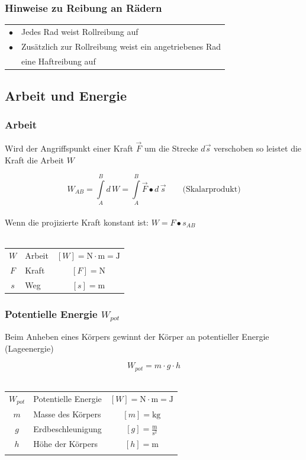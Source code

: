 		\subsubsection{Hinweise zu Reibung an Rädern}
		
			\begin{tabular}{ll}
				$\bullet$ & Jedes Rad weist Rollreibung auf \\
				$\bullet$ & Zusätzlich zur Rollreibung weist ein angetriebenes Rad \\
				          & eine Haftreibung auf \\
			\end{tabular}

	\subsection{Arbeit und Energie}
	
		\subsubsection{Arbeit}
		
			Wird der Angriffspunkt einer Kraft $\vec{F}$ um die Strecke $d \vec{s}$ verschoben so leistet die Kraft die Arbeit $W$ 
			
			$$ \boxed{ W_{AB} =  \int \limits_A^B d \, W =  \int \limits_A^B \vec{F} \bullet d \, \vec{s} \qquad \text{(Skalarprodukt)} }$$ \\
			
			Wenn die projizierte Kraft konstant ist: $\boxed{ W = F \bullet s_{AB} }$ \\
			\\
			\begin{tabular}{c l c}
				$W$ & Arbeit & $[W] = \mathrm{N \cdot m = J}$ \\
				$F$ & Kraft & $[F] = \mathrm{N}$ \\
				$s$ & Weg & $[s] = \mathrm{m}$ \\
			\end{tabular}

		\subsubsection{Potentielle Energie $W_{pot}$}
			Beim Anheben eines Körpers gewinnt der Körper an potentieller Energie (Lageenergie) 
			
			$$ \boxed{ W_{pot} = m \cdot g \cdot h}$$
			\\
			\begin{tabular}{c l c}
				$W_{pot}$ & Potentielle Energie & $[W] = \mathrm{N \cdot m = J}$ \\
				$m$ & Masse des Körpers & $[m] = \mathrm{kg}$ \\
				$g$ & Erdbeschleunigung & $[g] = \mathrm{\frac{m}{s^2}}$ \\
				$h$ & Höhe der Körpers & $[h] = \mathrm{m}$ \\
				\\
			\end{tabular}
			
